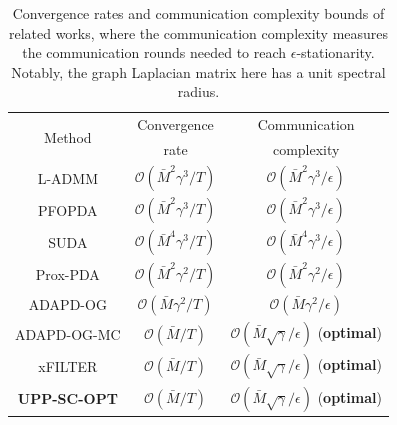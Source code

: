 \documentclass[12pt,draftcls,onecolumn]{IEEEtran}
\begin{document}
\begin{table}[t]
    \centering
    \begin{tabular}{ccc}
        \toprule
        \multirow{2}{*}{Method} & Convergence & Communication \\
        & rate & complexity \\
        \midrule
        L-ADMM \cite{yi2022sublinear} & $\mathcal{O}(\bar{M}^2\gamma^3/T)$ & $\mathcal{O}(\bar{M}^2\gamma^3/\epsilon)$ \\
        PFOPDA \cite{yi2021linear} & $\mathcal{O}(\bar{M}^2\gamma^3/ T)$& $\mathcal{O}(\bar{M}^2\gamma^3/ \epsilon)$ \\
        SUDA \cite{alghunaim_unified_2022} & $\mathcal{O}(\bar{M}^4\gamma^3/T)$ & $\mathcal{O}(\bar{M}^4\gamma^3/\epsilon)$ \\
        Prox-PDA \cite{hong_prox-pda_2017} & $\mathcal{O}(\bar{M}^2\gamma^2/T)$ & $\mathcal{O}(\bar{M}^2\gamma^2/\epsilon)$\\
        ADAPD-OG \cite{mancino2023decentralized} & $\mathcal{O}(\bar{M}\gamma^2/T)$ & $\mathcal{O}(\bar{M}\gamma^2/\epsilon)$ \\
        ADAPD-OG-MC \cite{mancino2023decentralized} & $\mathcal{O}(\bar{M}/T)$ & $\mathcal{O}(\bar{M}\sqrt{\gamma}/\epsilon)$ (\textbf{optimal}) \\
        xFILTER \cite{sun_distributed_2019} & $\mathcal{O}(\bar{M}/T)$ & $\mathcal{O}(\bar{M}\sqrt{\gamma}/\epsilon)$ (\textbf{optimal}) \\
        \textbf{UPP-SC-OPT} & $\mathcal{O}(\bar{M}/T)$ & $\mathcal{O}(\bar{M}\sqrt{\gamma}/\epsilon)$ (\textbf{optimal})\\
        \bottomrule
    \end{tabular}
    \caption{Convergence rates and communication complexity bounds of related works, where the communication complexity measures the communication rounds needed to reach $\epsilon$-stationarity. Notably, the graph Laplacian matrix here has a unit spectral radius.}
    \label{tab:convergence rate}
\end{table}
\end{document}
